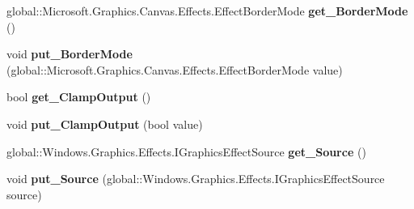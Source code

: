 \begin{DoxyCompactItemize}
\item 
\mbox{\label{interface_microsoft_1_1_graphics_1_1_canvas_1_1_effects_1_1_i_convolve_matrix_effect_affc8471c9cb7ddc40d4424d5f547f965}} 
global\+::\+Microsoft.\+Graphics.\+Canvas.\+Effects.\+Effect\+Border\+Mode {\bfseries get\+\_\+\+Border\+Mode} ()
\item 
\mbox{\label{interface_microsoft_1_1_graphics_1_1_canvas_1_1_effects_1_1_i_convolve_matrix_effect_af99f279c04d692c5fd026a935a236a97}} 
void {\bfseries put\+\_\+\+Border\+Mode} (global\+::\+Microsoft.\+Graphics.\+Canvas.\+Effects.\+Effect\+Border\+Mode value)
\item 
\mbox{\label{interface_microsoft_1_1_graphics_1_1_canvas_1_1_effects_1_1_i_convolve_matrix_effect_aefc08fc8fe409f44d6ab7b76799cc3e8}} 
bool {\bfseries get\+\_\+\+Clamp\+Output} ()
\item 
\mbox{\label{interface_microsoft_1_1_graphics_1_1_canvas_1_1_effects_1_1_i_convolve_matrix_effect_a0370614326a36da6fcf0fc7c69ba9ce2}} 
void {\bfseries put\+\_\+\+Clamp\+Output} (bool value)
\item 
\mbox{\label{interface_microsoft_1_1_graphics_1_1_canvas_1_1_effects_1_1_i_convolve_matrix_effect_a3db9cc0d5d797ce3307cc5f93aac58c3}} 
global\+::\+Windows.\+Graphics.\+Effects.\+I\+Graphics\+Effect\+Source {\bfseries get\+\_\+\+Source} ()
\item 
\mbox{\label{interface_microsoft_1_1_graphics_1_1_canvas_1_1_effects_1_1_i_convolve_matrix_effect_aa2e57e481287adea1356db1184a275e8}} 
void {\bfseries put\+\_\+\+Source} (global\+::\+Windows.\+Graphics.\+Effects.\+I\+Graphics\+Effect\+Source source)
\item 
\mbox{\label{interface_microsoft_1_1_graphics_1_1_canvas_1_1_effects_1_1_i_convolve_matrix_effect_a70e52e1ad7aa0146de7c12790467cdac}} 

\end{DoxyCompactItemize}
